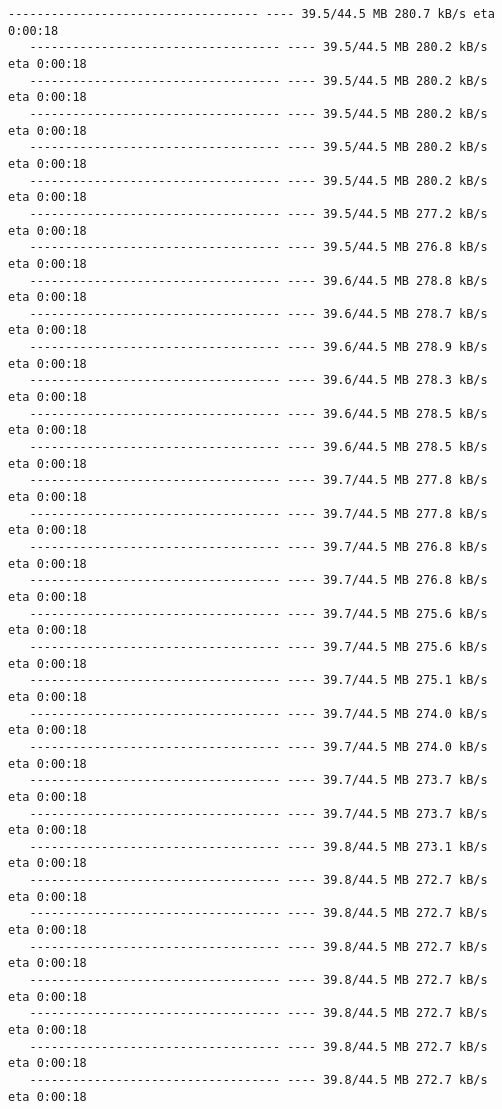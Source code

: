 \documentclass[11pt]{article}
\begin{document}
\begin{Verbatim}[commandchars=\\\{\}]
   ----------------------------------- ---- 39.5/44.5 MB 280.7 kB/s eta 0:00:18
   ----------------------------------- ---- 39.5/44.5 MB 280.2 kB/s eta 0:00:18
   ----------------------------------- ---- 39.5/44.5 MB 280.2 kB/s eta 0:00:18
   ----------------------------------- ---- 39.5/44.5 MB 280.2 kB/s eta 0:00:18
   ----------------------------------- ---- 39.5/44.5 MB 280.2 kB/s eta 0:00:18
   ----------------------------------- ---- 39.5/44.5 MB 280.2 kB/s eta 0:00:18
   ----------------------------------- ---- 39.5/44.5 MB 277.2 kB/s eta 0:00:18
   ----------------------------------- ---- 39.5/44.5 MB 276.8 kB/s eta 0:00:18
   ----------------------------------- ---- 39.6/44.5 MB 278.8 kB/s eta 0:00:18
   ----------------------------------- ---- 39.6/44.5 MB 278.7 kB/s eta 0:00:18
   ----------------------------------- ---- 39.6/44.5 MB 278.9 kB/s eta 0:00:18
   ----------------------------------- ---- 39.6/44.5 MB 278.3 kB/s eta 0:00:18
   ----------------------------------- ---- 39.6/44.5 MB 278.5 kB/s eta 0:00:18
   ----------------------------------- ---- 39.6/44.5 MB 278.5 kB/s eta 0:00:18
   ----------------------------------- ---- 39.7/44.5 MB 277.8 kB/s eta 0:00:18
   ----------------------------------- ---- 39.7/44.5 MB 277.8 kB/s eta 0:00:18
   ----------------------------------- ---- 39.7/44.5 MB 276.8 kB/s eta 0:00:18
   ----------------------------------- ---- 39.7/44.5 MB 276.8 kB/s eta 0:00:18
   ----------------------------------- ---- 39.7/44.5 MB 275.6 kB/s eta 0:00:18
   ----------------------------------- ---- 39.7/44.5 MB 275.6 kB/s eta 0:00:18
   ----------------------------------- ---- 39.7/44.5 MB 275.1 kB/s eta 0:00:18
   ----------------------------------- ---- 39.7/44.5 MB 274.0 kB/s eta 0:00:18
   ----------------------------------- ---- 39.7/44.5 MB 274.0 kB/s eta 0:00:18
   ----------------------------------- ---- 39.7/44.5 MB 273.7 kB/s eta 0:00:18
   ----------------------------------- ---- 39.7/44.5 MB 273.7 kB/s eta 0:00:18
   ----------------------------------- ---- 39.8/44.5 MB 273.1 kB/s eta 0:00:18
   ----------------------------------- ---- 39.8/44.5 MB 272.7 kB/s eta 0:00:18
   ----------------------------------- ---- 39.8/44.5 MB 272.7 kB/s eta 0:00:18
   ----------------------------------- ---- 39.8/44.5 MB 272.7 kB/s eta 0:00:18
   ----------------------------------- ---- 39.8/44.5 MB 272.7 kB/s eta 0:00:18
   ----------------------------------- ---- 39.8/44.5 MB 272.7 kB/s eta 0:00:18
   ----------------------------------- ---- 39.8/44.5 MB 272.7 kB/s eta 0:00:18
   ----------------------------------- ---- 39.8/44.5 MB 272.7 kB/s eta 0:00:18

\end{Verbatim}
\end{document}
